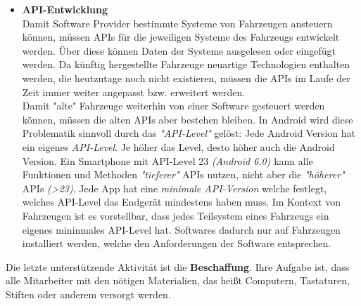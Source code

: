 \begin{itemize}
	\item[] \hspace{-0.6cm} \textbf{API-Entwicklung}\\
	Damit Software Provider bestimmte Systeme von Fahrzeugen ansteuern können, müssen APIs für die jeweiligen Systeme des Fahrzeugs entwickelt werden. Über diese können Daten der Systeme ausgelesen oder eingefügt werden. Da künftig hergestellte Fahrzeuge neuartige Technologien enthalten werden, die heutzutage noch nicht existieren, müssen die APIs im Laufe der Zeit immer weiter angepasst bzw. erweitert werden.\\
	Damit "alte" Fahrzeuge weiterhin von einer Software gesteuert werden können, müssen die alten APIs aber bestehen bleiben. In Android wird diese Problematik sinnvoll durch das \textit{"API-Level"} gelöst: Jede Android Version hat ein eigenes \textit{API-Level}. Je höher das Level, desto höher auch die Android Version. Ein Smartphone mit API-Level 23 \textit{(Android 6.0)} kann alle Funktionen und Methoden \textit{"tieferer"} APIs nutzen, nicht aber die \textit{"höherer"} APIs \textit{(>23)}. Jede App hat eine \textit{minimale API-Version} welche festlegt, welches API-Level das Endgerät mindestens haben muss. Im Kontext von Fahrzeugen ist es vorstellbar, dass jedes Teilsystem eines Fahrzeugs ein eigenes mininmales API-Level hat. Softwares dadurch nur auf Fahrzeugen installiert werden, welche den Anforderungen der Software entsprechen. 
\end{itemize}

Die letzte unterstützende Aktivität ist die \textbf{Beschaffung}. Ihre Aufgabe ist, dass alle Mitarbeiter mit den nötigen Materialien, das heißt Computern, Tastaturen, Stiften oder anderem versorgt werden.\\\\